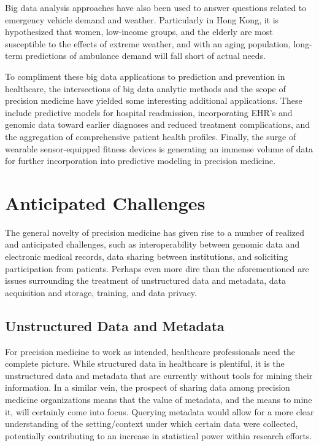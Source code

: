 \setlength{\parskip}{1em}\noindent Big data analysis approaches have also been used to answer questions related to emergency vehicle demand and weather. Particularly in Hong Kong, it is hypothesized that women, low-income groups, and the elderly are most susceptible to the effects of extreme weather, and with an aging population, long-term predictions of ambulance demand will fall short of actual needs\cite{Wong2015}.

\setlength{\parskip}{1em}\noindent To compliment these big data applications to prediction and prevention in healthcare, the intersections of big data analytic methods and the scope of precision medicine have yielded some interesting additional applications. These include predictive models for hospital readmission, incorporating EHR's and genomic data toward earlier diagnoses and reduced treatment complications, and the aggregation of comprehensive patient health profiles\cite{Leff2015}. Finally, the surge of wearable sensor-equipped fitness devices is generating an immense volume of data for further incorporation into predictive modeling in precision medicine\cite{ehealth2017}.

\section{Anticipated Challenges}
The general novelty of precision medicine has given rise to a number of realized and anticipated challenges\cite{Leff2015}\cite{He2017}, such as interoperability between genomic data and electronic medical records, data sharing between institutions, and soliciting participation from patients\cite{ehealth2017}. Perhaps even more dire than the aforementioned are issues surrounding the treatment of unstructured data and metadata, data acquisition and storage, training, and data privacy\cite{ehealth2017}\cite{He2017}.

\subsection{Unstructured Data and Metadata}
For precision medicine to work as intended, healthcare professionals need the complete picture. While structured data in healthcare is plentiful, it is the unstructured data and metadata that are currently without tools for mining their information. In a similar vein, the prospect of sharing data among precision medicine organizations means that the value of metadata, and the means to mine it, will certainly come into focus. Querying metadata would allow for a more clear understanding of the setting/context under which certain data were collected, potentially contributing to an increase in statistical power within research efforts\cite{ehealth2017}.

